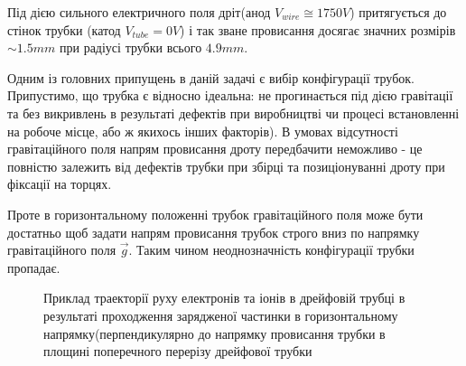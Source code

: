 \documentclass[]{article}
\begin{document}
	Під дією сильного електричного поля дріт(анод $V_{wire}\cong1750 V$) притягується до стінок трубки (катод $V_{tube}=0V$) і так зване провисання досягає значних розмірів $\sim1.5mm$ при радіусі трубки всього $4.9 mm$. 

	Одним із головних припущень в даній задачі є вибір конфігурації трубок. Припустимо, що трубка є відносно ідеальна: не прогинається під дією гравітації та без викривлень в результаті дефектів при виробництві чи процесі встановленні на робоче місце, або ж якихось інших факторів). В умовах відсутності гравітаційного поля напрям провисання дроту передбачити неможливо - це повністю залежить від дефектів трубки при збірці та позиціонуванні дроту при фіксації на торцях.
	
	Проте в горизонтальному положенні трубок гравітаційного поля може бути достатньо щоб задати напрям провисання трубок строго вниз по напрямку гравітаційного поля $\vec{g}$. Таким чином неоднозначність конфігурації трубки пропадає.
	\begin{figure}[h]
		\centering
		\qquad
		\caption{ Приклад траекторії руху електронів та іонів в дрейфовій трубці в результаті проходження зарядженої частинки в горизонтальному напрямку(перпендикулярно до напрямку провисання трубки в площині поперечного перерізу дрейфової трубки}			
	\end{figure}
	
\end{document}
